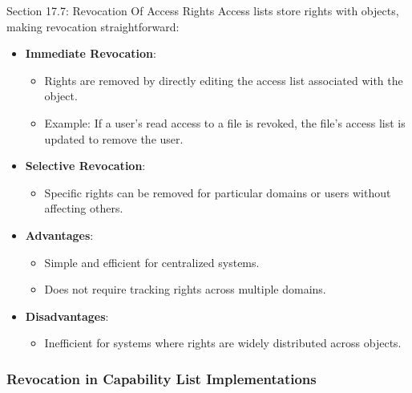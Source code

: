 \begin{notes}{Section 17.7: Revocation Of Access Rights}
    Access lists store rights with objects, making revocation straightforward:
    \begin{itemize}
        \item \textbf{Immediate Revocation}:
        \begin{itemize}
            \item Rights are removed by directly editing the access list associated with the object.
            \item Example: If a user's read access to a file is revoked, the file's access list is updated to remove the user.
        \end{itemize}
        \item \textbf{Selective Revocation}:
        \begin{itemize}
            \item Specific rights can be removed for particular domains or users without affecting others.
        \end{itemize}
        \item \textbf{Advantages}:
        \begin{itemize}
            \item Simple and efficient for centralized systems.
            \item Does not require tracking rights across multiple domains.
        \end{itemize}
        \item \textbf{Disadvantages}:
        \begin{itemize}
            \item Inefficient for systems where rights are widely distributed across objects.
        \end{itemize}
    \end{itemize}
    
    \subsubsection*{Revocation in Capability List Implementations}
    

\end{notes}

